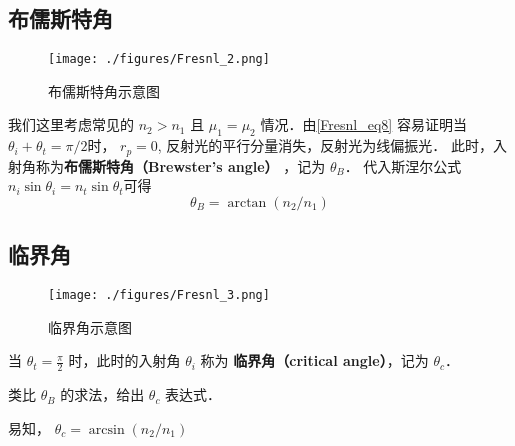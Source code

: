 \subsection{布儒斯特角}
\begin{figure}[ht]
\centering
\texttt{[image: ./figures/Fresnl\_2.png]}
\caption{布儒斯特角示意图} \label{Fresnl_fig2}
\end{figure}
我们这里考虑常见的 $n_2>n_1$ 且 $\mu_1 = \mu_2$ 情况．由\autoref{Fresnl_eq8} 容易证明当 $\theta_i + \theta_t = \pi/2$时， $r_p = 0$, 反射光的平行分量消失，反射光为线偏振光． 此时，入射角称为\textbf{布儒斯特角（Brewster's angle）} ，记为 $\theta_B$． 代入斯涅尔公式 $n_i\sin\theta_i = n_t\sin\theta_t$可得
\begin{equation}
\theta_B = \arctan (n_2/n_1)
\end{equation}

\subsection{临界角}
\begin{figure}[ht]
\centering
\texttt{[image: ./figures/Fresnl\_3.png]}
\caption{临界角示意图} \label{Fresnl_fig3}
\end{figure}
\begin{definition}{}
当 $\theta_t  = \frac{\pi}{2}$ 时，此时的入射角 $\theta_i$ 称为 \textbf{临界角（critical angle）}，记为 $\theta_c$．
\end{definition}

\begin{exercise}{}
类比 $\theta_B$ 的求法，给出 $\theta_c$ 表达式．
\end{exercise}

易知， $\theta_c = \arcsin(n_2/n_1)$


